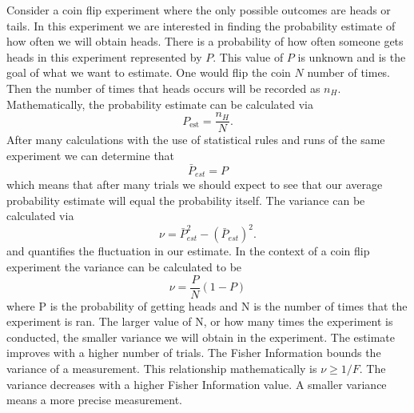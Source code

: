 \documentclass[twocolumn]{article}
\begin{document}
Consider a coin flip experiment where the only possible outcomes are heads or tails. In this experiment we are interested in finding the probability estimate of how often we will obtain heads. There is a probability of how often someone gets heads in this experiment represented by $P$. This value of $P$ is unknown and is the goal of what we want to estimate. One would flip the coin $N$ number of times. Then the number of times that heads occurs will be recorded as $n_H$. Mathematically, the probability estimate can be calculated via
\begin{equation}\label{eq:47}
P_{\text{est}}=\frac{n_H}{N}.
\end{equation}
After many calculations with the use of statistical rules and runs of the same experiment we can determine that
\begin{equation} \label{eq:48}
\bar{P}_{est}=P
\end{equation}
which means that after many trials we should expect to see that our average probability estimate will equal the probability itself. The variance can be calculated via
\begin{equation} \label{eq:49}
\nu=\bar{P}^2_{est}-(\bar{P}_{est})^2.
\end{equation}
and quantifies the fluctuation in our estimate. In the context of a coin flip experiment the variance can be calculated to be
\begin{equation} \label{eq:50}
\nu=\frac{P}{N}(1-P)
\end{equation}
where P is the probability of getting heads and N is the number of times that the experiment is ran. The larger value of N, or how many times the experiment is conducted, the smaller variance we will obtain in the experiment. The estimate improves with a higher number of trials. The Fisher Information bounds the variance of a measurement. This relationship mathematically  is $\nu\geq1/F$. The variance decreases with a higher Fisher Information value. A smaller variance means a more precise measurement.
\end{document}
